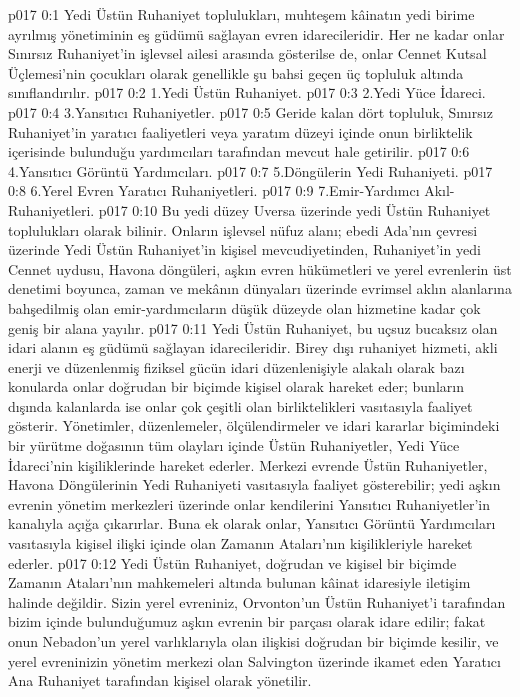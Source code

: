 \vs p017 0:1 Yedi Üstün Ruhaniyet toplulukları, muhteşem kâinatın yedi birime ayrılmış yönetiminin eş güdümü sağlayan evren idarecileridir. Her ne kadar onlar Sınırsız Ruhaniyet’in işlevsel ailesi arasında gösterilse de, onlar Cennet Kutsal Üçlemesi’nin çocukları olarak genellikle şu bahsi geçen üç topluluk altında sınıflandırılır.
\vs p017 0:2 1.\bibnobreakspace Yedi Üstün Ruhaniyet.
\vs p017 0:3 2.\bibnobreakspace Yedi Yüce İdareci.
\vs p017 0:4 3.\bibnobreakspace Yansıtıcı Ruhaniyetler.
\vs p017 0:5 Geride kalan dört topluluk, Sınırsız Ruhaniyet’in yaratıcı faaliyetleri veya yaratım düzeyi içinde onun birliktelik içerisinde bulunduğu yardımcıları tarafından mevcut hale getirilir.
\vs p017 0:6 4.\bibnobreakspace Yansıtıcı Görüntü Yardımcıları.
\vs p017 0:7 5.\bibnobreakspace Döngülerin Yedi Ruhaniyeti.
\vs p017 0:8 6.\bibnobreakspace Yerel Evren Yaratıcı Ruhaniyetleri.
\vs p017 0:9 7.\bibnobreakspace Emir\hyp{}Yardımcı Akıl\hyp{}Ruhaniyetleri.
\vs p017 0:10 Bu yedi düzey Uversa üzerinde yedi Üstün Ruhaniyet toplulukları olarak bilinir. Onların işlevsel nüfuz alanı; ebedi Ada’nın çevresi üzerinde Yedi Üstün Ruhaniyet’in kişisel mevcudiyetinden, Ruhaniyet’in yedi Cennet uydusu, Havona döngüleri, aşkın evren hükümetleri ve yerel evrenlerin üst denetimi boyunca, zaman ve mekânın dünyaları üzerinde evrimsel aklın alanlarına bahşedilmiş olan emir\hyp{}yardımcıların düşük düzeyde olan hizmetine kadar çok geniş bir alana yayılır.
\vs p017 0:11 Yedi Üstün Ruhaniyet, bu uçsuz bucaksız olan idari alanın eş güdümü sağlayan idarecileridir. Birey dışı ruhaniyet hizmeti, akli enerji ve düzenlenmiş fiziksel gücün idari düzenlenişiyle alakalı olarak bazı konularda onlar doğrudan bir biçimde kişisel olarak hareket eder; bunların dışında kalanlarda ise onlar çok çeşitli olan birliktelikleri vasıtasıyla faaliyet gösterir. Yönetimler, düzenlemeler, ölçülendirmeler ve idari kararlar biçimindeki bir yürütme doğasının tüm olayları içinde Üstün Ruhaniyetler, Yedi Yüce İdareci’nin kişiliklerinde hareket ederler. Merkezi evrende Üstün Ruhaniyetler, Havona Döngülerinin Yedi Ruhaniyeti vasıtasıyla faaliyet gösterebilir; yedi aşkın evrenin yönetim merkezleri üzerinde onlar kendilerini Yansıtıcı Ruhaniyetler’in kanalıyla açığa çıkarırlar. Buna ek olarak onlar, Yansıtıcı Görüntü Yardımcıları vasıtasıyla kişisel ilişki içinde olan Zamanın Ataları’nın kişilikleriyle hareket ederler.
\vs p017 0:12 Yedi Üstün Ruhaniyet, doğrudan ve kişisel bir biçimde Zamanın Ataları’nın mahkemeleri altında bulunan kâinat idaresiyle iletişim halinde değildir. Sizin yerel evreniniz, Orvonton’un Üstün Ruhaniyet’i tarafından bizim içinde bulunduğumuz aşkın evrenin bir parçası olarak idare edilir; fakat onun Nebadon’un yerel varlıklarıyla olan ilişkisi doğrudan bir biçimde kesilir, ve yerel evreninizin yönetim merkezi olan Salvington üzerinde ikamet eden Yaratıcı Ana Ruhaniyet tarafından kişisel olarak yönetilir.
